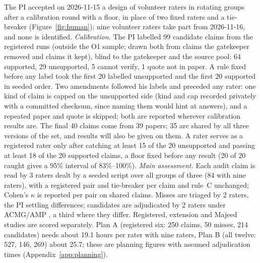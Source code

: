\documentclass{article} %
\begin{document}
The PI accepted on 2026-11-15 a design of volunteer raters in rotating groups after a calibration round with a floor, in place of two fixed raters and a tie-breaker (Figure~\ref{fig:human}); nine volunteer raters take part from 2026-11-16, and none is identified. \emph{Calibration.} The PI labelled 99 candidate claims from the registered runs (outside the O1 sample; drawn both from claims the gatekeeper removed and claims it kept), blind to the gatekeeper and the source pool: 64 supported, 29 unsupported, 5 cannot verify, 1 quote not in paper. A rule fixed before any label took the first 20 labelled unsupported and the first 20 supported in seeded order. Two amendments followed his labels and preceded any rater: one kind of claim is capped on the unsupported side (kind and cap recorded privately with a committed checksum, since naming them would hint at answers), and a repeated paper and quote is skipped; both are reported wherever calibration results are. The final 40 claims come from 39 papers; 35 are shared by all three versions of the set, and results will also be given on them. A rater serves as a registered rater only after catching at least 15 of the 20 unsupported and passing at least 18 of the 20 supported claims, a floor fixed before any result (20 of 20 caught gives a 95\% interval of 83\%--100\%). \emph{Main assessment.} Each audit claim is read by 3 raters dealt by a seeded script over all groups of three (84 with nine raters), with a registered pair and tie-breaker per claim and rule~C unchanged; Cohen's $\kappa$ \citep{Cohen1960CoefficientAgreement} is reported per pair on shared claims. Misses are triaged by 2 raters, the PI settling differences; candidates are adjudicated by 2 raters under ACMG/AMP \citep{richards2015_acmg}, a third where they differ. Registered, extension and Majeed studies are scored separately. Plan A (registered six: 250 claims, 50 misses, 214 candidates) needs about 19.1 hours per rater with nine raters, Plan B (all twelve: 527, 146, 269) about 25.7; these are planning figures with assumed adjudication times (Appendix~\ref{app:planning}).
\end{document}

